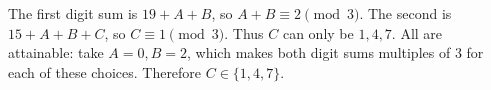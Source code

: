 The first digit sum is $19+A+B$, so $A+B\equiv2\pmod3$. The second is $15+A+B+C$, so $C\equiv1\pmod3$. Thus $C$ can only be $1,4,7$. All are attainable: take $A=0,B=2$, which makes both digit sums multiples of $3$ for each of these choices. Therefore $\boxed{C\in\{1,4,7\}}$.
